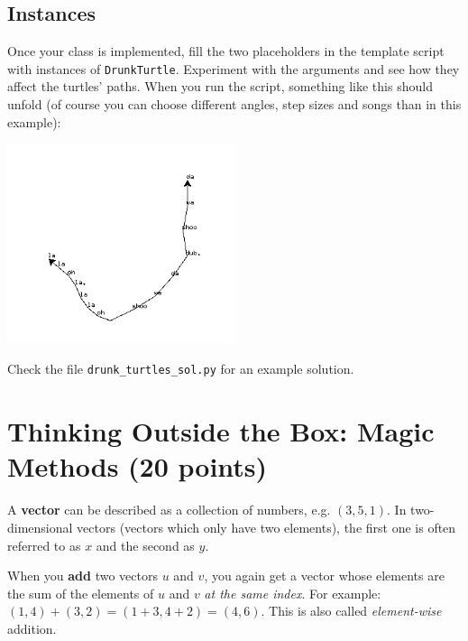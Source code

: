 
\subsection{Instances}

Once your class is implemented, fill the two placeholders in the template script with instances of {\tt DrunkTurtle}. Experiment with the arguments and see how they affect the turtles' paths. When you run the script, something like this should unfold (of course you can choose different angles, step sizes and songs than in this example):

\begin{center}
    \includegraphics[width=0.5\textwidth]{09_OOP/drunk_turtles.png}
\end{center}

\vspace{1em}

\begin{solution}
    Check the file {\tt drunk\_turtles\_sol.py} for an example solution.
\end{solution}





\section{Thinking Outside the Box: Magic Methods (20 points)}

A {\bf vector} can be described as a collection of numbers, e.g. $(3, 5, 1)$. In two-dimensional vectors (vectors which only have two elements), the first one is often referred to as $x$ and the second as $y$.

\vspace{1em}

\noindent When you {\bf add} two vectors $u$ and $v$, you again get a vector whose elements are the sum of the elements of $u$ and $v$ {\it at the same index}. For example: $(1, 4) + (3, 2) = (1+3, 4+2) = (4, 6)$. This is also called {\it element-wise} addition.

